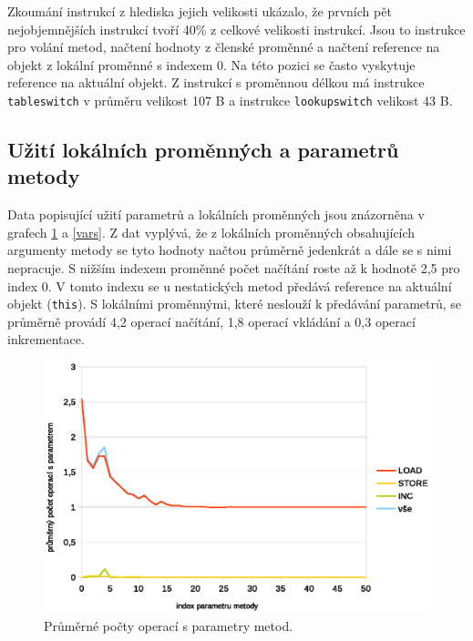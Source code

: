 Zkoumání instrukcí z hlediska jejich velikosti ukázalo, že prvních pět nejobjemnějších instrukcí tvoří 40\% z celkové velikosti instrukcí. Jsou to instrukce pro volání metod, načtení hodnoty z členské proměnné a načtení reference na objekt z lokální proměnné s indexem 0. Na této pozici se často vyskytuje reference na aktuální objekt. Z instrukcí s proměnnou délkou má instrukce \texttt{tableswitch} v průměru velikost 107 B a instrukce \texttt{lookupswitch} velikost 43 B.

\subsection{Užití lokálních proměnných a parametrů metody}

Data popisující užití parametrů a lokálních proměnných jsou znázorněna v grafech \ref{params} a \ref{vars}. Z dat vyplývá, že z lokálních proměnných obsahujících argumenty metody se tyto hodnoty načtou průměrně jedenkrát a dále se s nimi nepracuje. S nižším indexem proměnné počet načítání roste až k hodnotě 2,5 pro index 0. V tomto indexu se u nestatických metod předává reference na aktuální objekt (\texttt{this}). S lokálními proměnnými, které neslouží k předávání parametrů, se průměrně provádí 4,2 operací načítání, 1,8 operací vkládání a 0,3 operací inkrementace.

\begin{figure}[h!]
\centering
\includegraphics[scale=0.9]{fig/params}
\caption{Průměrné počty operací s parametry metod.}\label{params}
\end{figure}

